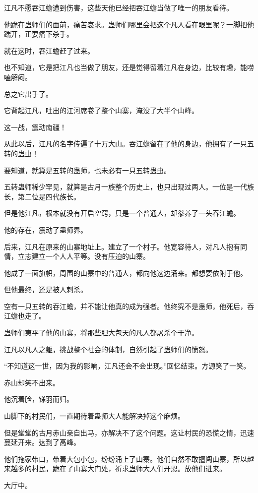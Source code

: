 \begin{this_body}
江凡不愿吞江蟾遭到伤害，这些天他已经把吞江蟾当做了唯一的朋友看待。

他跪在蛊师们的面前，痛苦哀求。蛊师们哪里会把这个凡人看在眼里呢？一脚把他踹开，正要痛下杀手。

就在这时，吞江蟾赶了过来。

也不知道，它是把江凡也当做了朋友，还是觉得留着江凡在身边，比较有趣，能唠嗑解闷。

总之它出手了。

它背起江凡，吐出的江河席卷了整个山寨，淹没了大半个山峰。

这一战，震动南疆！

从此以后，江凡的名字传遍了十万大山。吞江蟾留在了他的身边，他拥有了一只五转的蛊虫！

要知道，就算是五转的蛊师，也未必有一只五转蛊虫。

五转蛊师稀少罕见，就算是古月一族整个历史上，也只出现过两人。一位是一代族长，第二位是四代族长。

但是他江凡，根本就没有开启空窍，只是一个普通人，却豢养了一头吞江蟾。

他的存在，震动了蛊师界。

后来，江凡在原来的山寨地址上。建立了一个村子。他宽容待人，对凡人抱有同情，立志建立一个人人平等。没有压迫的山寨。

他成了一面旗帜，周围的山寨中的普通人，都向他这边涌来。都想要依附于他。

但他最终，还是被人刺杀。

空有一只五转的吞江蟾，并不能让他真的成为强者。他终究不是蛊师，他死后，吞江蟾也走了。

蛊师们夷平了他的山寨，将那些胆大包天的凡人都屠杀个干净。

江凡以凡人之躯，挑战整个社会的体制，自然引起了蛊师们的愤怒。

“不知道这一世，因为我的影响，江凡还会不会出现。”回忆结束。方源笑了一笑。

赤山却笑不出来。

他沉着脸，铩羽而归。

山脚下的村民们，一直期待着蛊师大人能解决掉这个麻烦。

但是堂堂的古月赤山亲自出马，亦解决不了这个问题。这让村民的恐慌之情，迅速蔓延开来。达到了高峰。

他们拖家带口，带着大包小包，纷纷涌上了山寨。他们自然不敢擅闯山寨，所以越来越多的村民，跪在了山寨大门处，祈求蛊师大人们开恩。放他们进来。

大厅中。


\end{this_body}
